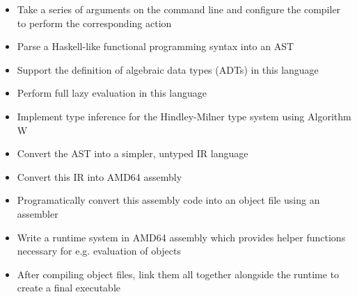 \documentclass[9pt]{extarticle}
\begin{document}
\begin{itemize}
  \item Take a series of arguments on the command line and configure the compiler to perform the corresponding action

  \item Parse a Haskell-like functional programming syntax into an AST

  \item Support the definition of algebraic data types (ADTs) in this language

  \item Perform full lazy evaluation in this language

  \item Implement type inference for the Hindley-Milner type system using Algorithm W

  \item Convert the AST into a simpler, untyped IR language

  \item Convert this IR into AMD64 assembly
  
  \item Programatically convert this assembly code into an object file using an assembler

  \item Write a runtime system in AMD64 assembly which provides helper functions necessary for e.g. evaluation of objects

  \item After compiling object files, link them all together alongside the runtime to create a final executable

\end{itemize}
\end{document}
